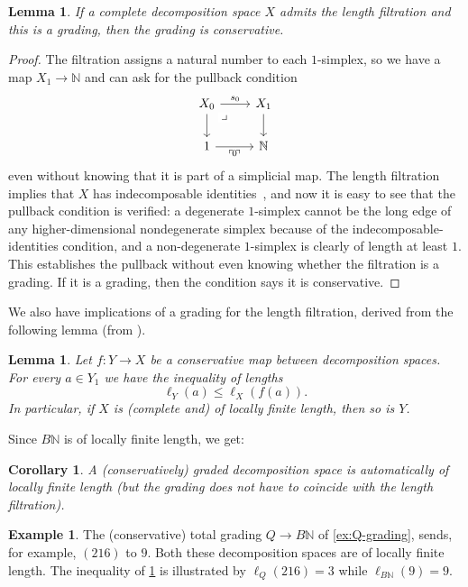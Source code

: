 \documentclass{amsart}
\newcommand{\yora}{a}
\newcommand{\N}{\mathbb{N}}
\newcommand{\drpullback}{\arrow[phantom]{dr}[very near start,description]{\lrcorner}}
\newcommand{\name}[1]{\ulcorner \!#1\! \urcorner}
\newtheorem{lemma}[theorem]{Lemma}
\newtheorem{corollary}[theorem]{Corollary}
\theoremstyle{definition}
\newtheorem{example}[theorem]{Example}
\theoremstyle{noname}
\begin{document}
\begin{lemma}
If a complete decomposition space $X$ admits the length filtration and this is a grading, then the grading is conservative.
\end{lemma}
\begin{proof}
  The filtration assigns a natural number to each $1$-simplex, so we have a map
  $X_1\to \N$ and can ask for the pullback condition
  \[
  \begin{tikzcd}
    X_0 \drpullback \ar[d] \ar[r, "s_0"] & X_1 \ar[d] \\
    1 \ar[r, "\name{0}"'] & \N
    \end{tikzcd}
  \] 
  even without knowing that it is part of a simplicial map. The length filtration
  implies that $X$ has indecomposable
  identities~\cite{GKT2}, and now it is easy to see
  that the pullback condition is verified: 
  a degenerate $1$-simplex cannot be the long edge of any higher-dimensional nondegenerate  
  simplex because of the indecomposable-identities condition, and a non-degenerate
  $1$-simplex is clearly of length at least $1$. This establishes the pullback
  without even knowing whether the filtration is a grading. If it 
  is a grading, then the condition says it is conservative.
\end{proof}

We also have implications of a grading for the length filtration, derived from the 
following lemma (from \cite[Lemma 5.4.2]{GKT:Crapo}).



\begin{lemma}\label{lem:locally finite length}
  Let $f:Y\to X$ be a conservative map between decomposition spaces.
  For every $\yora\in Y_1$ we have the inequality of lengths
  $$
  \ell_Y(\yora) \leq \ell_X(f(\yora)).
  $$
  In particular, if $X$ is (complete and) of locally finite length, then so is $Y$.
\end{lemma}

Since $B\N$ is of locally finite length, we get:

\begin{corollary}
  A (conservatively) graded 
  decomposition space is automatically of locally finite length
  (but the grading does not have to coincide with the length filtration).
\end{corollary}

\begin{example}
  The (conservative) total grading $Q \to B\N$ of \cref{ex:Q-grading}, sends, for example, $(216)$ to $9$. Both these decomposition spaces are of locally
  finite length. The inequality of \cref{lem:locally finite length} is illustrated by
  $\ell_Q(216) = 3$ while $\ell_{B\N}(9)=9$.
\end{example}
  
\end{document}
